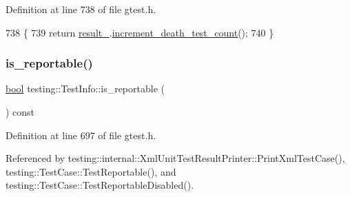 Definition at line 738 of file gtest.\+h.


\begin{DoxyCode}
738                                    \{
739     \textcolor{keywordflow}{return} \hyperlink{classtesting_1_1TestInfo_a108fd469897a8d4e5c4361947a5ed785}{result\_}.\hyperlink{classtesting_1_1TestResult_a07faaa1d16a991f34222d02e10c75dc2}{increment\_death\_test\_count}();
740   \}
\end{DoxyCode}
\mbox{\label{classtesting_1_1TestInfo_a63e7042028b0b846f4b5a1e5bcffc079}} 
\subsubsection{\texorpdfstring{is\+\_\+reportable()}{is\_reportable()}}
{\footnotesize\ttfamily \hyperlink{classbool}{bool} testing\+::\+Test\+Info\+::is\+\_\+reportable (\begin{DoxyParamCaption}{ }\end{DoxyParamCaption}) const\hspace{0.3cm}{\ttfamily [inline]}}



Definition at line 697 of file gtest.\+h.



Referenced by testing\+::internal\+::\+Xml\+Unit\+Test\+Result\+Printer\+::\+Print\+Xml\+Test\+Case(), testing\+::\+Test\+Case\+::\+Test\+Reportable(), and testing\+::\+Test\+Case\+::\+Test\+Reportable\+Disabled().


